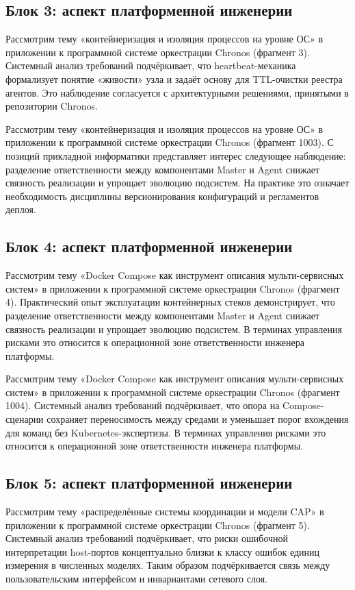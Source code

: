 \subsection{Блок 3: аспект платформенной инженерии}
 Рассмотрим тему «контейнеризация и изоляция процессов на уровне ОС» в приложении к программной системе оркестрации Chronos (фрагмент 3). Системный анализ требований подчёркивает, что heartbeat-механика формализует понятие «живости» узла и задаёт основу для TTL-очистки реестра агентов. Это наблюдение согласуется с архитектурными решениями, принятыми в репозитории Chronos.

 Рассмотрим тему «контейнеризация и изоляция процессов на уровне ОС» в приложении к программной системе оркестрации Chronos (фрагмент 1003). С позиций прикладной информатики представляет интерес следующее наблюдение: разделение ответственности между компонентами Master и Agent снижает связность реализации и упрощает эволюцию подсистем. На практике это означает необходимость дисциплины версионирования конфигураций и регламентов деплоя.

\subsection{Блок 4: аспект платформенной инженерии}
 Рассмотрим тему «Docker Compose как инструмент описания мульти-сервисных систем» в приложении к программной системе оркестрации Chronos (фрагмент 4). Практический опыт эксплуатации контейнерных стеков демонстрирует, что разделение ответственности между компонентами Master и Agent снижает связность реализации и упрощает эволюцию подсистем. В терминах управления рисками это относится к операционной зоне ответственности инженера платформы.

 Рассмотрим тему «Docker Compose как инструмент описания мульти-сервисных систем» в приложении к программной системе оркестрации Chronos (фрагмент 1004). Системный анализ требований подчёркивает, что опора на Compose-сценарии сохраняет переносимость между средами и уменьшает порог вхождения для команд без Kubernetes-экспертизы. В терминах управления рисками это относится к операционной зоне ответственности инженера платформы.

\subsection{Блок 5: аспект платформенной инженерии}
 Рассмотрим тему «распределённые системы координации и модели CAP» в приложении к программной системе оркестрации Chronos (фрагмент 5). Системный анализ требований подчёркивает, что риски ошибочной интерпретации host-портов концептуально близки к классу ошибок единиц измерения в численных моделях. Таким образом подчёркивается связь между пользовательским интерфейсом и инвариантами сетевого слоя.

